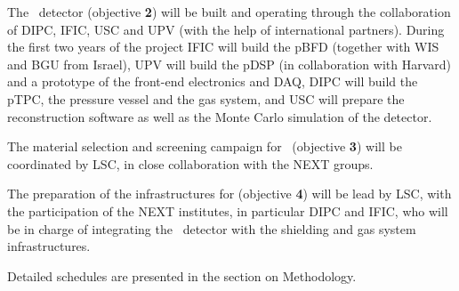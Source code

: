 \indent

The \HDEMO\ detector (objective {\bf 2}) will be built and operating through the collaboration of DIPC, IFIC, USC and UPV (with the help of international partners). 
During the first two years of the project IFIC will build the pBFD (together with WIS and BGU from Israel), UPV will build the pDSP (in collaboration with Harvard) and a prototype of the front-end electronics and DAQ, DIPC will build the pTPC, the pressure vessel and the gas system, and USC will prepare the reconstruction software as well as the Monte Carlo simulation of the detector. 

The material selection and screening campaign for \NHD\ (objective {\bf 3})  will be coordinated by LSC, in close collaboration with the NEXT groups. 

The preparation of the infrastructures for \NHD (objective {\bf 4})  will be lead by LSC, with the participation of the NEXT institutes, in particular DIPC and IFIC, who will be in charge of integrating the \NHD\ detector with the shielding and gas system infrastructures.

Detailed schedules are presented in the section on Methodology.  
  